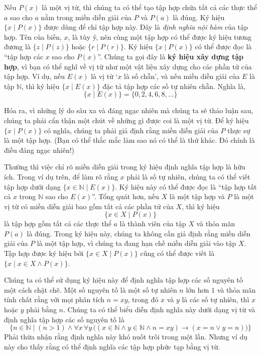 Nếu $P(x)$ là một vị từ, thì chúng ta có thể tạo tập hợp chứa tất cả các thực thể $a$ sao cho $a$ nằm trong miền diễn giải của $P$ và $P(a)$ là đúng. Ký hiệu $\{x \mid P(x)\}$ được dùng để chỉ tập hợp này. Đây là \textit{định nghĩa nội hàm} của tập hợp. Tên của biến, $x$, là tùy ý, nên cùng một tập hợp có thể được ký hiệu tương đương là $\{z \mid P(z)\}$ hoặc $\{r \mid P(r)\}$. Ký hiệu $\{x \mid P(x)\}$ có thể được đọc là ``tập hợp các $x$ sao cho $P(x)$''. Chúng ta gọi đây là \textbf{ký hiệu xây dựng tập hợp}, vì bạn có thể nghĩ về vị từ như một vật liệu xây dựng cho các phần tử của tập hợp. Ví dụ, nếu $E(x)$ là vị từ `$x$ là số chẵn', và nếu miền diễn giải của $E$ là tập $\mathbb{N}$, thì ký hiệu $\{x \mid E(x)\}$ đặc tả tập hợp các số tự nhiên chẵn. Nghĩa là,
\[
\{x \mid E(x)\} = \{0, 2, 4, 6, 8, \ldots\}
\]

\begin{infobox}
Hóa ra, vì những lý do sâu xa và đáng ngạc nhiên mà chúng ta sẽ thảo luận sau, chúng ta phải cẩn thận một chút về những gì được coi là một vị từ. Để ký hiệu $\{x \mid P(x)\}$ có nghĩa, chúng ta phải giả định rằng miền diễn giải của $P$ thực sự là một tập hợp. (Bạn có thể thắc mắc làm sao nó có thể là thứ khác. Đó chính là điều đáng ngạc nhiên!)
\end{infobox}

Thường thì việc chỉ rõ miền diễn giải trong ký hiệu định nghĩa tập hợp là hữu ích. Trong ví dụ trên, để làm rõ rằng $x$ phải là số tự nhiên, chúng ta có thể viết tập hợp dưới dạng $\{x \in \mathbb{N} \mid E(x)\}$. Ký hiệu này có thể được đọc là ``tập hợp tất cả $x$ trong $\mathbb{N}$ sao cho $E(x)$''. Tổng quát hơn, nếu $X$ là một tập hợp và $P$ là một vị từ có miền diễn giải bao gồm tất cả các phần tử của $X$, thì ký hiệu
\[
\{x \in X \mid P(x)\}
\]
là tập hợp gồm tất cả các thực thể $a$ là thành viên của tập $X$ và thỏa mãn $P(a)$ là đúng. Trong ký hiệu này, chúng ta không cần giả định rằng miền diễn giải của $P$ là một tập hợp, vì chúng ta đang hạn chế miền diễn giải vào tập $X$. Tập hợp được ký hiệu bởi $\{x \in X \mid P(x)\}$ cũng có thể được viết là $\{x \mid x \in X \land P(x)\}$.

\begin{example}
Chúng ta có thể sử dụng ký hiệu này để định nghĩa tập hợp các số nguyên tố một cách chặt chẽ. Một số nguyên tố là một số tự nhiên $n$ lớn hơn $1$ và thỏa mãn tính chất rằng với mọi phân tích $n = xy$, trong đó $x$ và $y$ là các số tự nhiên, thì $x$ hoặc $y$ phải bằng $n$. Chúng ta có thể biểu diễn định nghĩa này dưới dạng vị từ và định nghĩa tập hợp các số nguyên tố là
\[
\{n \in \mathbb{N} \mid (n > 1) \land \forall x\,\forall y\,\bigl((x \in \mathbb{N} \land y \in \mathbb{N} \land n = xy) \to (x = n \lor y = n)\bigr)\}
\]
Phải thừa nhận rằng định nghĩa này khó nuốt trôi trong một lần. Nhưng ví dụ này cho thấy rằng có thể định nghĩa các tập hợp phức tạp bằng vị từ.
\end{example}

